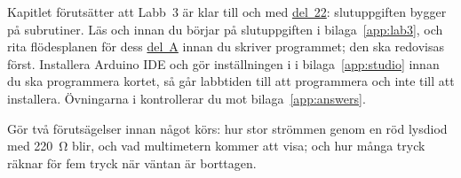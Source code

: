 Kapitlet förutsätter att Labb~3 är klar till och med \hyperref[lab3:d22]{del~22}: slutuppgiften
bygger på subrutiner. Läs  och  innan du börjar på
slutuppgiften i bilaga~\ref{app:lab3}, och rita flödesplanen för dess \hyperref[lab3:a]{del~A}
innan du skriver programmet; den ska redovisas först. Installera Arduino IDE och gör inställningen
i  i bilaga~\ref{app:studio} innan du ska programmera kortet, så går labbtiden till
att programmera och inte till att installera. Övningarna i  kontrollerar
du mot bilaga~\ref{app:answers}.

Gör två förutsägelser innan något körs: hur stor strömmen genom en röd lysdiod med 220~Ω blir, och
vad multimetern kommer att visa; och hur många tryck  räknar för fem tryck
när väntan är borttagen.





